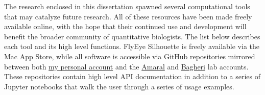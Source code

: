 The research enclosed in this dissertation spawned several computational tools that may catalyze future research. All of these resources have been made freely available online, with the hope that their continued use and development will benefit the broader community of quantitative biologists. The list below describes each tool and its high level functions. FlyEye Silhouette is freely available via the Mac App Store, while all software is accessible via GitHub repositories mirrored between both \href{https://github.com/sebastianbernasek/}{my personal account} and the \href{https://github.com/amarallab}{Amaral} and \href{https://github.com/bagherilab}{Bagheri} lab accounts. These repositories contain high level API documentation in addition to a series of Jupyter notebooks that walk the user through a series of usage examples. 


